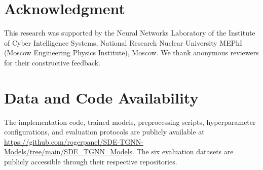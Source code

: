 \documentclass[journal]{IEEEtran}
\begin{document}
\section*{Acknowledgment}

This research was supported by the Neural Networks Laboratory of the Institute of Cyber Intelligence Systems, National Research Nuclear University MEPhI (Moscow Engineering Physics Institute), Moscow. We thank anonymous reviewers for their constructive feedback.


\section*{Data and Code Availability}

The implementation code, trained models, preprocessing scripts, hyperparameter configurations, and evaluation protocols are publicly available at \url{https://github.com/rogerpanel/SDE-TGNN-Models/tree/main/SDE_TGNN_Models}. The six evaluation datasets are publicly accessible through their respective repositories.
\end{document}
